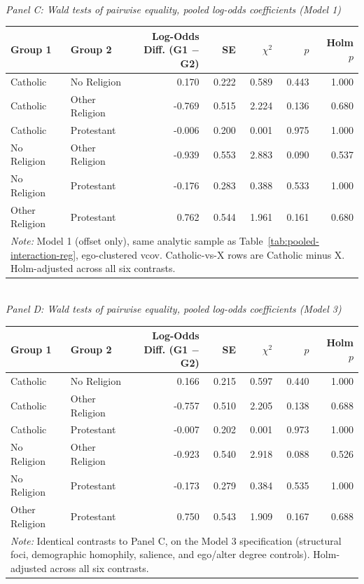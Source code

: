 \begin{table}[htbp]
\begin{tabular}{llrrc}
\end{tabular}
\\[8pt]
\textit{Panel C: Wald tests of pairwise equality, pooled log-odds coefficients (Model 1)}\\[2pt]
\begin{tabular}{llrrrrr}
\toprule
Group 1 & Group 2 & Log-Odds Diff. (G1 $-$ G2) & SE & $\chi^2$ & $p$ & Holm $p$ \\
\midrule
Catholic & No Religion & 0.170 & 0.222 & 0.589 & 0.443 & 1.000 \\
Catholic & Other Religion & -0.769 & 0.515 & 2.224 & 0.136 & 0.680 \\
Catholic & Protestant & -0.006 & 0.200 & 0.001 & 0.975 & 1.000 \\
No Religion & Other Religion & -0.939 & 0.553 & 2.883 & 0.090 & 0.537 \\
No Religion & Protestant & -0.176 & 0.283 & 0.388 & 0.533 & 1.000 \\
Other Religion & Protestant & 0.762 & 0.544 & 1.961 & 0.161 & 0.680 \\
\bottomrule
\multicolumn{7}{p{0.95\textwidth}}{\footnotesize \textit{Note:} Model 1 (offset only), same analytic sample as Table~\ref{tab:pooled-interaction-reg}, ego-clustered vcov. Catholic-vs-X rows are Catholic minus X. Holm-adjusted across all six contrasts.} \\
\end{tabular}
\\[8pt]
\textit{Panel D: Wald tests of pairwise equality, pooled log-odds coefficients (Model 3)}\\[2pt]
\begin{tabular}{llrrrrr}
\toprule
Group 1 & Group 2 & Log-Odds Diff. (G1 $-$ G2) & SE & $\chi^2$ & $p$ & Holm $p$ \\
\midrule
Catholic & No Religion & 0.166 & 0.215 & 0.597 & 0.440 & 1.000 \\
Catholic & Other Religion & -0.757 & 0.510 & 2.205 & 0.138 & 0.688 \\
Catholic & Protestant & -0.007 & 0.202 & 0.001 & 0.973 & 1.000 \\
No Religion & Other Religion & -0.923 & 0.540 & 2.918 & 0.088 & 0.526 \\
No Religion & Protestant & -0.173 & 0.279 & 0.384 & 0.535 & 1.000 \\
Other Religion & Protestant & 0.750 & 0.543 & 1.909 & 0.167 & 0.688 \\
\bottomrule
\multicolumn{7}{p{0.95\textwidth}}{\footnotesize \textit{Note:} Identical contrasts to Panel C, on the Model 3 specification (structural foci, demographic homophily, salience, and ego/alter degree controls). Holm-adjusted across all six contrasts.} \\
\end{tabular}
\end{table}
